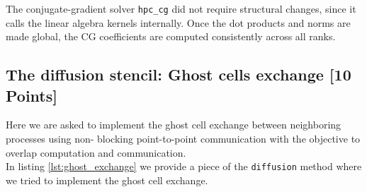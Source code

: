 \documentclass[unicode,10pt,a4paper,oneside,numbers=endperiod,openany]{scrartcl}
\begin{document}
The conjugate-gradient solver \texttt{hpc\_cg} did not require structural
changes, since it calls the linear algebra kernels internally. Once the dot
products and norms are made global, the CG coefficients are computed
consistently across all ranks.



\subsection{The diffusion stencil: Ghost cells exchange [10 Points]}
Here we are asked to implement the ghost cell exchange between neighboring processes using non-
blocking point-to-point communication with the objective to overlap computation and communication.\\
In listing \ref{lst:ghost_exchange} we provide a piece of the \texttt{diffusion} method where we tried to implement the ghost cell exchange.
\end{document}
